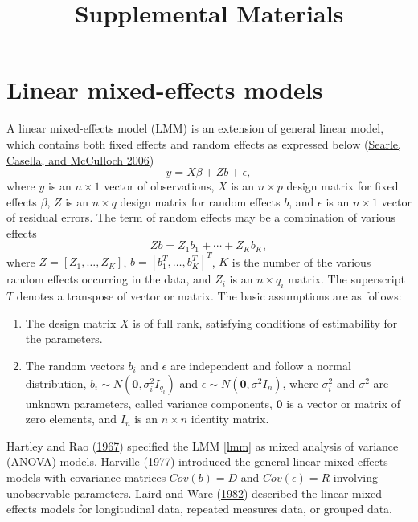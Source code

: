 \documentclass[
]{article}
\title{Supplemental Materials}
\author{}
\date{\vspace{-2.5em}}
\providecommand{\tightlist}{%
  \setlength{\itemsep}{0pt}\setlength{\parskip}{0pt}}
\begin{document}
\maketitle

{
\setcounter{tocdepth}{2}
\tableofcontents
}
\hypertarget{linear-mixed-effects-models}{%
\section{Linear mixed-effects
models}\label{linear-mixed-effects-models}}

A linear mixed-effects model (LMM) is an extension of general linear
model, which contains both fixed effects and random effects as expressed
below (\protect\hyperlink{ref-Searle2006}{Searle, Casella, and McCulloch
2006}) \begin{equation} \label{lmm}
y = X\beta + Zb + \epsilon,
\end{equation} where \(y\) is an \(n\times 1\) vector of observations,
\(X\) is an \(n\times p\) design matrix for fixed effects \(\beta\),
\(Z\) is an \(n\times q\) design matrix for random effects \(b\), and
\(\epsilon\) is an \(n\times 1\) vector of residual errors. The term of
random effects may be a combination of various effects \[
Zb = Z_1 b_1 + \cdots + Z_K b_K,
\] where \(Z=[Z_1,\ldots,Z_K]\), \(b=[b^T_1,\ldots,b^T_K]^T\), \(K\) is
the number of the various random effects occurring in the data, and
\(Z_i\) is an \(n\times q_i\) matrix. The superscript \(T\) denotes a
transpose of vector or matrix. The basic assumptions are as follows:

\begin{enumerate}
\def\labelenumi{(\arabic{enumi})}
\tightlist
\item
  The design matrix \(X\) is of full rank, satisfying conditions of
  estimability for the parameters.
\item
  The random vectors \(b_i\) and \(\epsilon\) are independent and follow
  a normal distribution, \(b_i \sim N(\mathbf{0}, \sigma^2_i I_{q_i})\)
  and \(\epsilon \sim N(\mathbf{0}, \sigma^2I_n)\), where \(\sigma^2_i\)
  and \(\sigma^2\) are unknown parameters, called variance components,
  \(\mathbf{0}\) is a vector or matrix of zero elements, and \(I_n\) is
  an \(n\times n\) identity matrix.
\end{enumerate}

Hartley and Rao (\protect\hyperlink{ref-HartleyRao1967}{1967}) specified
the LMM \eqref{lmm} as mixed analysis of variance (ANOVA) models.
Harville (\protect\hyperlink{ref-Harville1977}{1977}) introduced the
general linear mixed-effects models with covariance matrices
\(Cov(b) = D\) and \(Cov(\epsilon) = R\) involving unobservable
parameters. Laird and Ware (\protect\hyperlink{ref-Laird1982}{1982})
described the linear mixed-effects models for longitudinal data,
repeated measures data, or grouped data.
\end{document}
